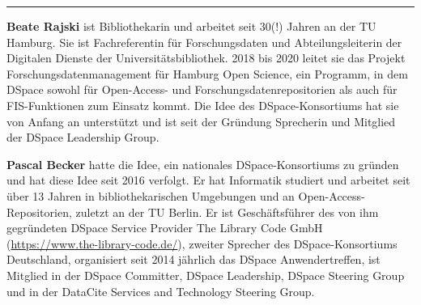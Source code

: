 \documentclass[a4paper,
fontsize=11pt,
oneside,
numbers=noperiodatend,
parskip=half-,
bibliography=totoc,
final
]{scrartcl}
\begin{document}
\begin{center}\rule{0.5\linewidth}{\linethickness}\end{center}

\textbf{Beate Rajski} ist Bibliothekarin und arbeitet seit 30(!) Jahren
an der TU Hamburg. Sie ist Fachreferentin für Forschungsdaten und
Abteilungsleiterin der Digitalen Dienste der Universitätsbibliothek.
2018 bis 2020 leitet sie das Projekt Forschungsdatenmanagement für
Hamburg Open Science, ein Programm, in dem DSpace sowohl für
Open-Access- und Forschungsdatenrepositorien als auch für FIS-Funktionen
zum Einsatz kommt. Die Idee des DSpace-Konsortiums hat sie von Anfang an
unterstützt und ist seit der Gründung Sprecherin und Mitglied der DSpace
Leadership Group.

\textbf{Pascal Becker} hatte die Idee, ein nationales DSpace-Konsortiums
zu gründen und hat diese Idee seit 2016 verfolgt. Er hat Informatik
studiert und arbeitet seit über 13 Jahren in bibliothekarischen
Umgebungen und an Open-Access-Repositorien, zuletzt an der TU Berlin. Er
ist Geschäftsführer des von ihm gegründeten DSpace Service Provider The
Library Code GmbH (\url{https://www.the-library-code.de/}), zweiter
Sprecher des DSpace-Konsortiums Deutschland, organisiert seit 2014
jährlich das DSpace Anwendertreffen, ist Mitglied in der DSpace
Committer, DSpace Leadership, DSpace Steering Group und in der DataCite
Services and Technology Steering Group.
\end{document}
